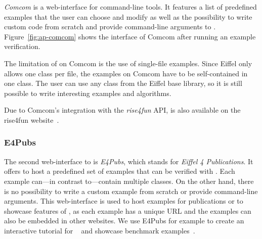 \emph{Comcom} is a web-interface for command-line tools. It features a list of predefined examples that the user can choose and modify as well as the possibility to write custom code from scratch and provide command-line arguments to \AutoProof. 
Figure~\ref{fig:ap-comcom} shows the interface of Comcom after running an example verification.

The limitation of \AutoProof on Comcom is the use of single-file examples. Since Eiffel only allows one class per file, the examples on Comcom have to be self-contained in one class. The user can use any class from the Eiffel base library, so it is still possible to write interesting examples and algorithms.

Due to Comcom's integration with the \emph{rise4fun} API, \AutoProof is also available on the rise4fun website~\cite{APRISE4FUN}.

\subsubsection{E4Pubs}

The second web-interface to \AutoProof is \emph{E4Pubs}, which stands for \emph{Eiffel 4 Publications}. It offers to host a predefined set of examples that can be verified with \AutoProof. Each example can---in contrast to---contain multiple classes. On the other hand, there is no possibility to write a custom example from scratch or provide command-line arguments. This web-interface is used to host examples for publications or to showcase features of \AutoProof, as each example has a unique URL and the examples can also be embedded in other websites. We use E4Pubs for example to create an interactive tutorial for \AutoProof~\cite{APTUTORIAL} and showcase benchmark examples~\cite{APREPO}.



